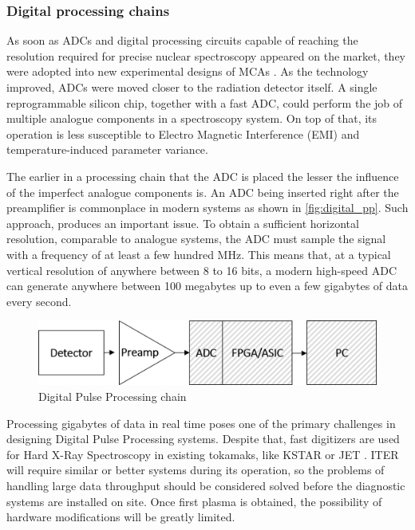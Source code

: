 \subsubsection{Digital processing chains}

As soon as ADCs and digital processing circuits capable of
reaching the resolution required for precise nuclear
spectroscopy appeared on the market, they were 
adopted into new experimental designs of MCAs \cite{mca_fpga}.
As the technology improved, ADCs were moved closer to the 
radiation detector itself.
A single reprogrammable silicon chip, together with a fast ADC,
could perform the job of multiple analogue components
in a spectroscopy system.
On top of that, its operation is less susceptible to Electro Magnetic
Interference (EMI) and temperature-induced parameter variance.
\cite{dpp_walewski}


The earlier in a processing chain that the ADC is placed the
lesser the influence of the imperfect analogue components is.
An ADC being inserted right after the preamplifier is commonplace
in modern systems as shown in \autoref{fig:digital_pp}.
Such approach, produces an important issue.
To obtain a sufficient horizontal resolution, comparable to analogue systems,
the ADC must sample the signal with a frequency of at least
a few hundred MHz. This means that, at a typical vertical resolution
of anywhere between 8 to 16 bits, a modern high-speed ADC
can generate anywhere between 100 megabytes 
up to even a few gigabytes of data every second.
\cite{dpp_walewski}

\begin{figure}[H]
  \centering
  \includegraphics[width=.7\linewidth]{media/digital_pulse_processing.png}
  \caption{Digital Pulse Processing chain}
  \label{fig:digital_pp}
\end{figure}

Processing gigabytes of data in real time poses one of 
the primary challenges in designing Digital Pulse Processing systems.
Despite that, fast digitizers are used for Hard X-Ray Spectroscopy
in existing tokamaks, like KSTAR or JET \cite{hxrm_jet, kstar_upgrade}.
ITER will require similar or better systems during its operation,
so the problems of handling large data throughput
should be considered solved before the diagnostic systems
are installed on site. Once first plasma is obtained,
the possibility of hardware modifications will be greatly limited.
 

